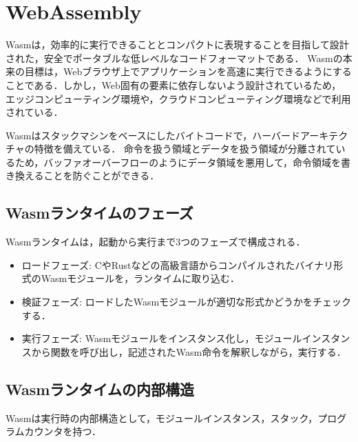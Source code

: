 \chapter{WebAssembly}
\label{sec:wasm}
Wasmは，効率的に実行できることとコンパクトに表現することを目指して設計された，安全でポータブルな低レベルなコードフォーマットである\cite{wasm-spec}．
Wasmの本来の目標は，Webブラウザ上でアプリケーションを高速に実行できるようにすることである．しかし，Web固有の要素に依存しないよう設計されているため，
エッジコンピューティング環境や，クラウドコンピューティング環境などで利用されている．

Wasmはスタックマシンをベースにしたバイトコードで，ハーバードアーキテクチャの特徴を備えている．
命令を扱う領域とデータを扱う領域が分離されているため，バッファオーバーフローのようにデータ領域を悪用して，命令領域を書き換えることを防ぐことができる．

\section{Wasmランタイムのフェーズ}
Wasmランタイムは，起動から実行まで3つのフェーズで構成される．
\begin{itemize}
    \item ロードフェーズ: CやRustなどの高級言語からコンパイルされたバイナリ形式のWasmモジュールを，ランタイムに取り込む．
    \item 検証フェーズ: ロードしたWasmモジュールが適切な形式かどうかをチェックする．
    \item 実行フェーズ: Wasmモジュールをインスタンス化し，モジュールインスタンスから関数を呼び出し，記述されたWasm命令を解釈しながら，実行する．
\end{itemize}

\section{Wasmランタイムの内部構造}
Wasmは実行時の内部構造として，モジュールインスタンス，スタック，プログラムカウンタを持つ．

\vspace*{0.5zh}
